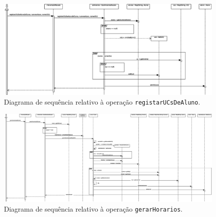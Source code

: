 \documentclass[12pt, a4paper]{article}
\begin{document}
\begin{landscape}
        \begin{figure}[H]
            \centering
            \includegraphics[scale=0.65]{Imagens/Modelos/registarUCsDeAluno.svg.eps}
            \caption{
                Diagrama de sequência relativo à operação \texttt{registarUCsDeAluno}.
            }
        \end{figure}

        \vspace*{\fill}
        \pagebreak
        \vspace*{\fill}

        \begin{figure}[H]
            \centering
            \includegraphics[scale=0.40]{Imagens/Modelos/gerarHorarios.svg.eps}
            \caption{
                Diagrama de sequência relativo à operação \texttt{gerarHorarios}.
            }
        \end{figure}

        \vspace*{\fill}
        \pagebreak
        \vspace*{\fill}


\end{landscape}
\end{document}
